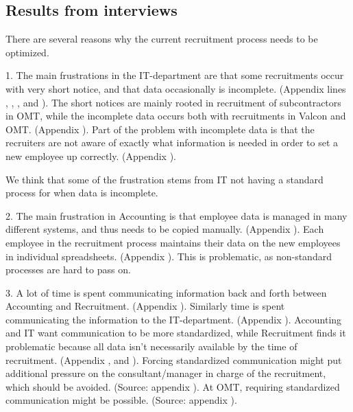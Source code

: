 \subsection{Results from interviews}
There are several reasons why the current recruitment process needs to be optimized.

1. The main frustrations in the IT-department are that some recruitments occur with very short notice, and that data occasionally is incomplete.
(Appendix  lines , , , and ).
The short notices are mainly rooted in recruitment of subcontractors in OMT, while the incomplete data occurs both with recruitments in Valcon and OMT.
(Appendix ).
Part of the problem with incomplete data is that the recruiters are not aware of exactly what information is needed in order to set a new employee up correctly.
(Appendix ).

We think that some of the frustration stems from IT not having a standard process for when data is incomplete.

2. The main frustration in Accounting is that employee data is managed in many different systems, and thus needs to be copied manually.
(Appendix ).
Each employee in the recruitment process maintains their data on the new employees in individual spreadsheets.
(Appendix ).
This is problematic, as non-standard processes are hard to pass on.

3. A lot of time is spent communicating information back and forth between Accounting and Recruitment.
(Appendix ).
Similarly time is spent communicating the information to the IT-department.
(Appendix ).
Accounting and IT want communication to be more standardized, while Recruitment finds it problematic because all data isn't necessarily available by the time of recruitment.
(Appendix ,  and ).
Forcing standardized communication might put additional pressure on the consultant/manager in charge of the recruitment, which should be avoided.
(Source: appendix ).
At OMT, requiring standardized communication might be possible.
(Source: appendix ).

